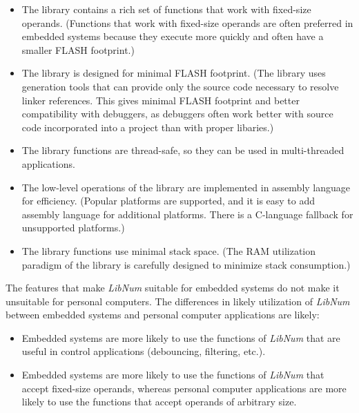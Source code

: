 \begin{itemize}
\item The library contains a rich set of functions that work with fixed-size operands.
      (Functions that work with fixed-size operands are often preferred in
      embedded systems because they execute more quickly and often have a smaller
      FLASH footprint.)
\item The library is designed for minimal FLASH footprint.
      (The library uses generation tools that can provide only the source code
      necessary to resolve linker references.  This gives minimal
      FLASH footprint and better compatibility with debuggers,
      as debuggers often work better with source code incorporated into
      a project than with proper libaries.)
\item The library functions are thread-safe, so they can be used in
      multi-threaded applications.
\item The low-level operations of the library are implemented in assembly language
      for efficiency.  (Popular platforms are supported, and it is easy
      to add assembly language for additional platforms. There is a C-language fallback
      for unsupported platforms.)
\item The library functions use minimal stack space.  (The RAM utilization
      paradigm of the library is carefully designed to minimize stack
      consumption.)
\end{itemize}

The features that make \emph{LibNum} suitable for embedded systems do
not make it unsuitable for personal computers.  The differences in likely
utilization of \emph{LibNum} between embedded systems and personal
computer applications are likely:

\begin{itemize}
\item Embedded systems are more likely to use the functions of
      \emph{LibNum} that are useful in control applications
      (debouncing, filtering, etc.).
\item Embedded systems are more likely to use the functions of
      \emph{LibNum} that accept fixed-size operands, whereas
      personal computer applications are more likely to use
      the functions that accept operands of arbitrary size.
\end{itemize}

